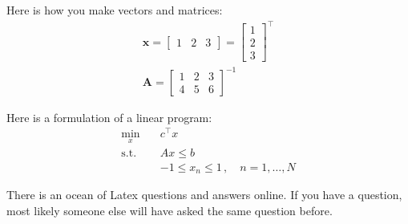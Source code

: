 \documentclass{article}
\begin{document}
Here is how you make vectors and matrices:
\begin{align}
    \mathbf x = \begin{bmatrix} 1 & 2 & 3 \end{bmatrix} = \begin{bmatrix} 1 \\ 2 \\ 3 \end{bmatrix}^\top \\
    \mathbf A = \begin{bmatrix} 1 & 2 & 3 \\ 4 & 5 & 6 \end{bmatrix}^{-1}
\end{align}

Here is a formulation of a linear program:
\begin{align*}
    \min_{x} \quad & c^\top x \\
    \mathrm{s.t.} \quad 
    & A x \leq b \\
    &-1 \leq x_n \leq 1 \,, \quad n = 1, \dots, N
\end{align*}

There is an ocean of Latex questions and answers online. If you have a question, most likely someone else will have asked the same question before. 

\medskip
 


\end{document}
